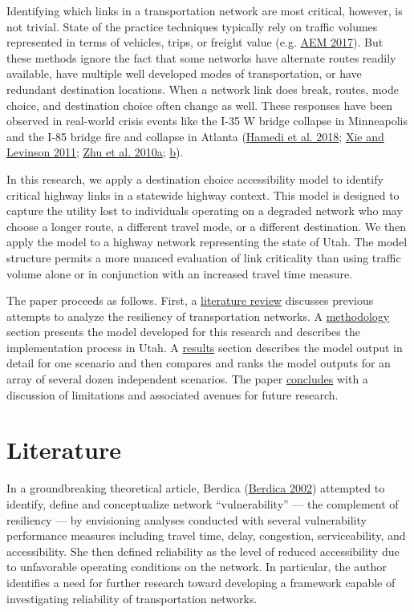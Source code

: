 \documentclass[]{ascelike-new}
\begin{document}
Identifying which links in a transportation network are most critical,
however, is not trivial. State of the practice techniques typically rely
on traffic volumes represented in terms of vehicles, trips, or freight
value (e.g. \protect\hyperlink{ref-aem2017}{AEM 2017}). But these
methods ignore the fact that some networks have alternate routes readily
available, have multiple well developed modes of transportation, or have
redundant destination locations. When a network link does break, routes,
mode choice, and destination choice often change as well. These
responses have been observed in real-world crisis events like the I-35 W
bridge collapse in Minneapolis and the I-85 bridge fire and collapse in
Atlanta (\protect\hyperlink{ref-hamedi2018}{Hamedi et al. 2018};
\protect\hyperlink{ref-xie2011}{Xie and Levinson 2011};
\protect\hyperlink{ref-zhu2010}{Zhu et al. 2010a};
\protect\hyperlink{ref-levinson2010}{b}).

In this research, we apply a destination choice accessibility model to
identify critical highway links in a statewide highway context. This
model is designed to capture the utility lost to individuals operating
on a degraded network who may choose a longer route, a different travel
mode, or a different destination. We then apply the model to a highway
network representing the state of Utah. The model structure permits a
more nuanced evaluation of link criticality than using traffic volume
alone or in conjunction with an increased travel time measure.

The paper proceeds as follows. First, a
\protect\hyperlink{litreview}{literature review} discusses previous
attempts to analyze the resiliency of transportation networks. A
\protect\hyperlink{methodology}{methodology} section presents the model
developed for this research and describes the implementation process in
Utah. A \protect\hyperlink{results}{results} section describes the model
output in detail for one scenario and then compares and ranks the model
outputs for an array of several dozen independent scenarios. The paper
\protect\hyperlink{conclusion}{concludes} with a discussion of
limitations and associated avenues for future research.


\hypertarget{litreview}{%
\section{Literature}\label{litreview}}

In a groundbreaking theoretical article, Berdica
(\protect\hyperlink{ref-berdica2002}{Berdica 2002}) attempted to
identify, define and conceptualize network ``vulnerability'' --- the
complement of resiliency --- by envisioning analyses conducted with
several vulnerability performance measures including travel time, delay,
congestion, serviceability, and accessibility. She then defined
reliability as the level of reduced accessibility due to unfavorable
operating conditions on the network. In particular, the author
identifies a need for further research toward developing a framework
capable of investigating reliability of transportation networks.
\end{document}
